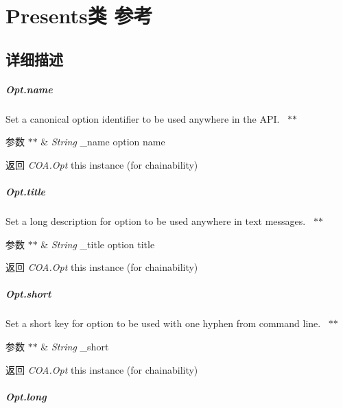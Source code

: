 \hypertarget{class_presents}{}\section{Presents类 参考}
\label{class_presents}


\subsection{详细描述}
\subparagraph*{Opt.\+name}

Set a canonical option identifier to be used anywhere in the A\+PI.~\newline
 $\ast$$\ast$
\begin{DoxyParams}{参数}
{\em $\ast$$\ast$} & {\itshape String} {\ttfamily \+\_\+name} option name~\newline
 {\bfseries }\\
\hline
\end{DoxyParams}
\begin{DoxyReturn}{返回}
{\bfseries } {\itshape C\+O\+A.\+Opt} {\ttfamily this} instance (for chainability)
\end{DoxyReturn}
\subparagraph*{Opt.\+title}

Set a long description for option to be used anywhere in text messages.~\newline
 $\ast$$\ast$
\begin{DoxyParams}{参数}
{\em $\ast$$\ast$} & {\itshape String} {\ttfamily \+\_\+title} option title~\newline
 {\bfseries }\\
\hline
\end{DoxyParams}
\begin{DoxyReturn}{返回}
{\bfseries } {\itshape C\+O\+A.\+Opt} {\ttfamily this} instance (for chainability)
\end{DoxyReturn}
\subparagraph*{Opt.\+short}

Set a short key for option to be used with one hyphen from command line.~\newline
 $\ast$$\ast$
\begin{DoxyParams}{参数}
{\em $\ast$$\ast$} & {\itshape String} {\ttfamily \+\_\+short}~\newline
 {\bfseries }\\
\hline
\end{DoxyParams}
\begin{DoxyReturn}{返回}
{\bfseries } {\itshape C\+O\+A.\+Opt} {\ttfamily this} instance (for chainability)
\end{DoxyReturn}
\subparagraph*{Opt.\+long}

